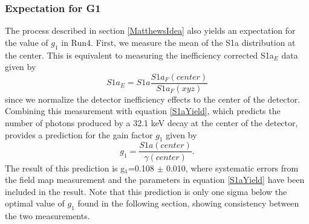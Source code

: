 \begin{figure} [!h]
\centering
{}
\qquad
{}
\label{ShittyKr2}
\end{figure}


\subsubsection{Expectation for G1}\label{G1pred}

The process described in section \ref{MatthewsIdea} also yields an expectation for the value of $g_1$ in Run4.  First, we measure the mean of the S1a distribution at the center.  This is equivalent to measuring the inefficiency corrected S1a$_E$ data given by 
\begin{equation}
S1a_E=S1a \frac{S1a_F(center)}{S1a_F(xyz)}
\end{equation}
since we normalize the detector inefficiency effects to the center of the detector.  Combining this measurement with equation \ref{S1aYield}, which predicts the number of photons produced by a 32.1 keV decay at the center of the detector, provides a prediction for the gain factor $g_1$ given by
\begin{equation}
g_1 = \frac{S1a(center)}{\gamma (center)}.
\end{equation}
The result of this prediction is g$_1$=0.108 $\pm$ 0.010, where systematic errors from the field map measurement and the parameters in equation  \ref{S1aYield} have been included in the result.  Note that this prediction is only one sigma below the optimal value of $g_1$ found in the following section, showing consistency between the two measurements.


